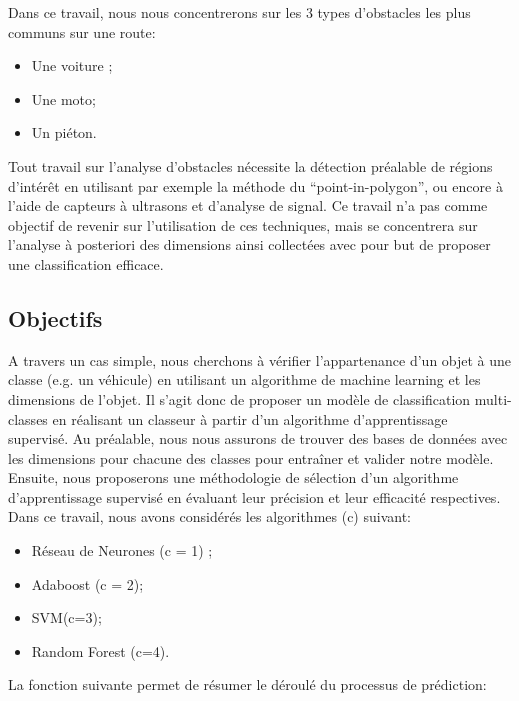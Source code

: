 \documentclass[a4paper]{report}
\begin{document}
Dans ce travail, nous nous concentrerons sur les 3 types d’obstacles les plus communs sur une route:
\begin{itemize}
\item Une voiture ;
\item Une moto;
\item Un piéton.

\end{itemize}
\medskip

Tout travail sur l’analyse d’obstacles nécessite la détection préalable de régions d’intérêt en utilisant par exemple la méthode du “point-in-polygon”\cite{ref1}, ou encore à l’aide de capteurs à ultrasons et d’analyse de signal\cite{ref2}. Ce travail n’a pas comme objectif de revenir sur l’utilisation de ces techniques, mais se concentrera sur l’analyse à posteriori des dimensions ainsi collectées avec pour but de proposer une classification efficace. 

\subsection*{Objectifs}
A travers un cas simple, nous cherchons à vérifier l’appartenance d’un objet à une classe (e.g. un véhicule) en utilisant un algorithme de machine learning et les dimensions de l’objet. Il s’agit donc de proposer un modèle de classification multi-classes en réalisant un classeur à partir d’un algorithme d’apprentissage supervisé. 
Au préalable, nous nous assurons de trouver des bases de données avec les dimensions pour chacune des classes pour entraîner et valider notre modèle. 
Ensuite, nous proposerons une méthodologie de sélection d’un algorithme d’apprentissage supervisé en évaluant leur précision et leur efficacité respectives. Dans ce travail, nous avons considérés les algorithmes (c) suivant: 
\begin{itemize}
\item Réseau de Neurones (c = 1) ;
\item Adaboost (c = 2);
\item SVM(c=3);
\item Random Forest (c=4).
\end{itemize}
\medbreak

La fonction suivante permet de résumer le déroulé du processus de prédiction:\\
\end{document}
